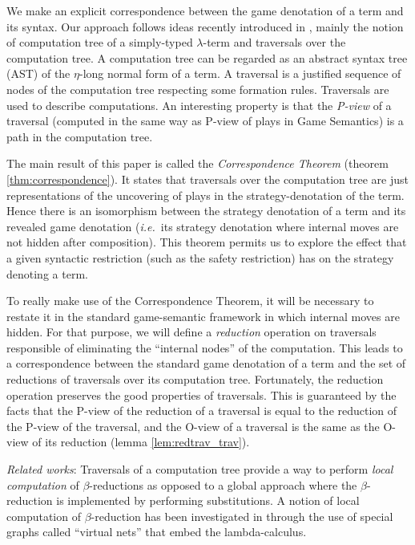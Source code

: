 We make an explicit correspondence between the game denotation of a
term and its syntax. Our approach follows ideas recently introduced
in \cite{OngLics2006}, mainly the notion of computation tree of a
simply-typed $\lambda$-term and traversals over the computation
tree. A computation tree can be regarded as an abstract syntax tree
(AST) of the $\eta$-long normal form of a term. A traversal is a
justified sequence of nodes of the computation tree respecting some
formation rules. Traversals are used to describe computations. An
interesting property is that the \emph{P-view} of a traversal
(computed in the same way as P-view of plays in Game Semantics) is a
path in the computation tree.

The main result of this paper is called the
\emph{Correspondence Theorem} (theorem \ref{thm:correspondence}). It
states that traversals over the computation tree are just
representations of the uncovering of plays in the
strategy-denotation of the term. Hence there is an isomorphism
between the strategy denotation of a term and its revealed game
denotation ({\it i.e.}~its strategy denotation where internal moves are
not hidden after composition). This theorem permits us to explore
the effect that a given syntactic restriction (such as the safety restriction) has on the strategy
denoting a term.

To really make use of the Correspondence Theorem, it will be
necessary to restate it in the standard game-semantic framework in
which internal moves are hidden. For that purpose, we will define a
\emph{reduction} operation on traversals responsible of eliminating
the ``internal nodes'' of the computation. This leads to a
correspondence between the standard game denotation of a term and
the set of reductions of traversals over its computation tree.
Fortunately, the reduction operation preserves the good properties
of traversals. This is guaranteed by the facts that the P-view of
the reduction of a traversal is equal to the reduction of the P-view
of the traversal, and the O-view of a traversal is the same as the
O-view of its reduction (lemma \ref{lem:redtrav_trav}). \vspace{8pt}

\emph{Related works}: Traversals of a computation tree provide a way
to perform \emph{local computation} of $\beta$-reductions as opposed
to a global approach where the $\beta$-reduction is implemented by
performing substitutions. A notion of local computation of
$\beta$-reduction has been investigated in
\cite{DanosRegnier-Localandasynchronou} through the use of special
graphs called ``virtual nets'' that embed the lambda-calculus.

